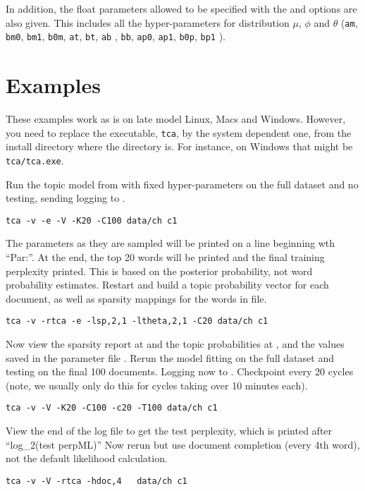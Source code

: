 \documentclass[a4paper,english]{article}
\begin{document}
In addition, the float parameters allowed to be specified with the
 and  options are also given. This includes all the hyper-parameters for distribution $\mu$, $\phi$ and $\theta$ (\texttt{am}, \texttt{bm0}, \texttt{bm1}, \texttt{b0m}, \texttt{at}, \texttt{bt}, \texttt{ab} , \texttt{bb}, \texttt{ap0}, \texttt{ap1}, \texttt{b0p}, \texttt{bp1} ).


\section{Examples}

These examples work as is on late model Linux, Macs and Windows.
However, you need to replace the executable,
\texttt{tca}, by the system dependent one,
from the install directory where the  directory is.
For instance, on Windows that might be \texttt{tca/tca.exe}.

Run the topic model from \citet{dtmpypwl} with fixed hyper-parameters on the full dataset and no testing,
sending logging to .
\begin{verbatim}
tca -v -e -V -K20 -C100 data/ch c1
\end{verbatim}
The parameters as they are sampled will be
printed on a line beginning wth ``Par:''.
At the end, the top 20 words will be printed and the
final training perplexity printed.  This is based on
the posterior probability, not word probability
estimates.
Restart and build a topic probability vector for each document,
as well as sparsity mappings for the words in 
 file.
\begin{verbatim}
tca -v -rtca -e -lsp,2,1 -ltheta,2,1 -C20 data/ch c1
\end{verbatim} 

Now view the sparsity report at  and
the topic probabilities at ,
and the values saved in the parameter file . 
Rerun the model fitting on the full dataset and testing
on the final 100 documents.  Logging now to .
Checkpoint every 20 cycles
(note, we usually only do this for cycles taking over 10 minutes each).

\begin{verbatim}
tca -v -V -K20 -C100 -c20 -T100 data/ch c1
\end{verbatim}

View the end of the log file to get the test perplexity,
which is printed after ``log\_2(test perpML)''
Now rerun but use document completion (every 4th word), not the default
likelihood calculation.
\begin{verbatim}
tca -v -V -rtca -hdoc,4   data/ch c1
\end{verbatim}
\end{document}
